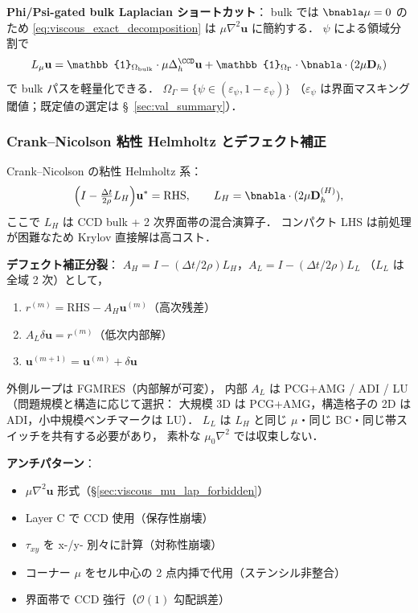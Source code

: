 \noindent\textbf{Phi/Psi-gated bulk Laplacian ショートカット}：
bulk では $\bnabla\mu=0$ のため \eqref{eq:viscous_exact_decomposition} は
$\mu\nabla^2\mathbf{u}$ に簡約する．
$\psi$ による領域分割で
\begin{equation*}
  L_\mu\mathbf{u}
  = \mathbb{1}_{\Omega_\text{bulk}}\cdot\mu\Delta_h^{\CCD}\mathbf{u}
  + \mathbb{1}_{\Omega_\Gamma}\cdot\bnabla\cdot(2\mu\mathbf{D}_h)
\end{equation*}
で bulk パスを軽量化できる．
$\Omega_\Gamma = \{\psi\in(\varepsilon_\psi, 1-\varepsilon_\psi)\}$
（$\varepsilon_\psi$ は界面マスキング閾値；既定値の選定は §~\ref{sec:val_summary}）．

\subsubsection{Crank--Nicolson 粘性 Helmholtz とデフェクト補正}
\label{sec:viscous_cn_defect}

Crank--Nicolson の粘性 Helmholtz 系：
\begin{equation}
  \Bigl(I - \tfrac{\Delta t}{2\rho}L_H\Bigr)\mathbf{u}^*
  = \text{RHS},
  \qquad L_H = \bnabla\cdot(2\mu\mathbf{D}_h^{(H)}),
  \label{eq:viscous_cn_helmholtz}
\end{equation}
ここで $L_H$ は CCD bulk + 2 次界面帯の混合演算子．
コンパクト LHS は前処理が困難なため Krylov 直接解は高コスト．

\noindent\textbf{デフェクト補正分裂}：
$A_H = I - (\Delta t/2\rho)L_H$，$A_L = I - (\Delta t/2\rho)L_L$
（$L_L$ は全域 2 次）として，
\begin{enumerate}
  \item $r^{(m)} = \text{RHS} - A_H\mathbf{u}^{(m)}$（高次残差）
  \item $A_L\delta\mathbf{u} = r^{(m)}$（低次内部解）
  \item $\mathbf{u}^{(m+1)} = \mathbf{u}^{(m)} + \delta\mathbf{u}$
\end{enumerate}
外側ループは FGMRES（内部解が可変），
内部 $A_L$ は PCG+AMG / ADI / LU（問題規模と構造に応じて選択：
大規模 3D は PCG+AMG，構造格子の 2D は ADI，小中規模ベンチマークは LU）．
$L_L$ は $L_H$ と同じ $\mu$・同じ BC・同じ帯スイッチを共有する必要があり，
素朴な $\mu_0\nabla^2$ では収束しない．

\noindent\textbf{アンチパターン}：
\begin{itemize}
  \item $\mu\nabla^2\mathbf{u}$ 形式（\S\ref{sec:viscous_mu_lap_forbidden}）
  \item Layer C で CCD 使用（保存性崩壊）
  \item $\tau_{xy}$ を x-/y- 別々に計算（対称性崩壊）
  \item コーナー $\mu$ をセル中心の 2 点内挿で代用（ステンシル非整合）
  \item 界面帯で CCD 強行（$\mathcal{O}(1)$ 勾配誤差）
\end{itemize}

